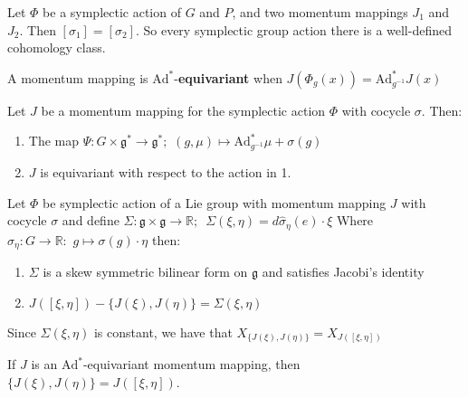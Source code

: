 \begin{prop}

Let $\Phi$ be a symplectic action of $G$ and $P$, and two momentum mappings $J_1$ and $J_2$. Then $[\sigma_1] = [\sigma_2]$. So every symplectic group action there is a well-defined cohomology class.
\end{prop}

\begin{defn}

A momentum mapping is $\mathrm{Ad}^*$-\textbf{equivariant} when $J(\Phi_g(x)) = \mathrm{Ad}^*_{g^{-1}} J(x)$

\end{defn}

\begin{prop}

Let $J$ be a momentum mapping for the symplectic action $\Phi$ with cocycle $\sigma$. Then: 
\begin{enumerate}
    \item The map $\Psi: G \times \mathfrak{g}^* \to \mathfrak{g}^*; \hspace{4pt} (g, \mu) \mapsto \mathrm{Ad}^*_{g^{-1}} \mu + \sigma(g) $
    \item $J$ is equivariant with respect to the action in 1.
\end{enumerate}

\end{prop}

\begin{thm}
Let $\Phi$ be symplectic action of a Lie group with momentum mapping $J$ with cocycle $\sigma$ and define
$\Sigma: \mathfrak{g} \times \mathfrak{g} \to \mathbb{R}; \hspace{6pt} \Sigma(\xi, \eta) = d\widehat{\sigma}_{\eta} (e) \cdot \xi$
Where $\widehat{\sigma}_{\eta} : G \to \mathbb{R}: \hspace{4pt} g \mapsto \sigma(g) \cdot \eta$ then:

\begin{enumerate}
    \item $\Sigma$ is a skew symmetric bilinear form on $\mathfrak{g}$ and satisfies Jacobi's identity
    \item $J([\xi, \eta]) - \{ J(\xi), J(\eta) \} = \Sigma(\xi, \eta)$
\end{enumerate}

Since $\Sigma(\xi, \eta)$ is constant, we have that $X_{ \{ J(\xi), J(\eta) \} } = X_{ J([\xi, \eta]) }$
\end{thm}

\begin{prop}

If $J$ is an $\mathrm{Ad}^*$-equivariant momentum mapping, then $\{ J(\xi), J(\eta) \} = J([\xi, \eta])$. 

\end{prop}

